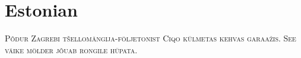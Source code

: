 

\presection\section*{\checkno Estonian}\postsection

\textsc{Põdur Zagrebi tšellomängija-följetonist Ciqo külmetas kehvas garaažis.
See väike mölder jõuab rongile hüpata.}